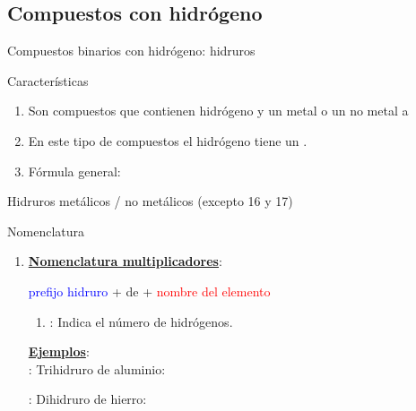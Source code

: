 \documentclass{beamer}
\newcommand{\nline}[1][6pt]{\\[#1]}
\begin{document}
\subsection{Compuestos con hidrógeno}

\begin{frame}[c]{Compuestos binarios con hidrógeno: hidruros}
    \begin{block}{\Large  Características}\vspace*{5pt}
        \begin{enumerate}[label=\itembolascolor{\arabic*}{mDarkTeal}]
            \item Son compuestos que contienen hidrógeno y un metal o un no metal a 

            \item En este tipo de compuestos el hidrógeno tiene un .

            \item Fórmula general: 
        \end{enumerate}
    \end{block}
\end{frame}

\begin{frame}[t]{Hidruros metálicos / no metálicos (excepto 16 y 17)}
    \begin{alertblock}{\Large Nomenclatura}\vspace*{5pt}
        \begin{enumerate}[label=\itembolascolor{\arabic*}{mDarkTeal}]
            \item \textbf{\uline{Nomenclatura multiplicadores}}:
                  \begin{center}
                      \textcolor{blue}{prefijo} \textcolor{blue}{hidruro}  + de + \textcolor{red}{nombre del elemento}
                  \end{center}

                  \begin{enumerate}[label=\textcolor{red}{$\bullet$}]
                      \item {}: Indica el número de hidrógenos.
                  \end{enumerate}

                  \textbf{\uline{Ejemplos}}:\nline

                   : Trihidruro de aluminio: 

                   : Dihidruro de hierro: 
        \end{enumerate}
    \end{alertblock}
\end{frame}
\end{document}
